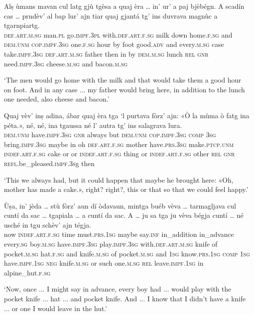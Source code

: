 \begin{linenumbers}
	\gll Alṣ ùmans mavan cul latg gjù tgèsa a quaj èra … in' ur’ a paj bjèbégn. A scadín cas … prndèv’ al bap lur’ ajn tiar quaj gjantá tg’ ins duvrava magnùc a tgarnpiartg.   \\
	\textsc{def.art.m.sg} man.\textsc{pl} go.\textsc{impf.3pl} with.\textsc{def.art.f.sg} milk down home.\textsc{f.sg} and \textsc{dem.unm} \textsc{cop.impf.3sg} {} one.\textsc{f.sg} hour by foot good.\textsc{adv} and every.\textsc{m.sg} case {} take.\textsc{impf.3sg} \textsc{def.art.m.sg} father then in by \textsc{dem.m.sg} lunch \textsc{rel} \textsc{gnr} need.\textsc{impf.3sg} cheese.\textsc{m.sg} and bacon.\textsc{m.sg} \\
\end{linenumbers}
\medskip
\glt `The men would go home with the milk and that would take them a good hour on foot. And in any case ... my father would bring here, in addition to the lunch one needed, also cheese and bacon.'
\medskip

\begin{linenumbers}
\gll Quaj vèv’ inṣ adina, ábar quaj èra tga `l purtava fòrz’ ajn: «Ò la mùma ò fatg ina péta.», né, né, ina tgaussa né l’ autra tg’ ins salagrava lura.\\
\textsc{dem.unm} have.\textsc{impf.3sg} \textsc{gnr} always but \textsc{dem.unm} \textsc{cop.impf.3sg} \textsc{comp} \textsc{3sg} bring.\textsc{impf.3sg} maybe in oh \textsc{def.art.f.sg} mother have.\textsc{prs.3sg} make.\textsc{ptcp.unm} \textsc{indef.art.f.sg} cake or or \textsc{indef.art.f.sg} thing or \textsc{indef.art.f.sg} other \textsc{rel} \textsc{gnr} \textsc{refl}.be\_pleased.\textsc{impf.3s}g then\\
\end{linenumbers}
\medskip
\glt `This we always had, but it could happen that maybe he brought here: «Oh, mother has made a cake.», right? right?, this or that so that we could feel happy.'
\medskip

\begin{linenumbers}
	\gll  Ùṣa, in' jèda … stù fòrz’ aun dí òdavaun, mintga buéb vèva … tarmagljava cul cuntí da sac … tgapiala … a cuntí da sac. A … ju sa tga ju vèva bégja cuntí … né usché in tgu schèv’ ajn tégja.\\
	now \textsc{indef.art.f.sg} time {} must.\textsc{prs.1sg} maybe say.\textsc{inf} in\_addition in\_advance every.\textsc{sg} boy.\textsc{m.sg} have.\textsc{impf.3sg} {} play.\textsc{impf.3sg} with.\textsc{def.art.m.sg} knife of pocket\textsc{.m.sg} {} hat.\textsc{f.sg} {} and knife.\textsc{m.sg} of pocket.\textsc{m.sg} and {} \textsc{1sg} know.\textsc{prs.1sg} \textsc{comp} \textsc{1sg} have.\textsc{impf.1sg} \textsc{neg} knife.\textsc{m.sg} {} or such one.\textsc{m.sg} \textsc{rel} leave.\textsc{impf.1sg} in alpine\_hut.\textsc{f.sg}  \\
\end{linenumbers}
\medskip
\glt `Now, once ... I might say in advance, every boy had ... would play with the pocket knife ... hat ... and pocket knife. And ... I know that I didn't have a knife ... or one I would leave in the hut.'
\medskip

